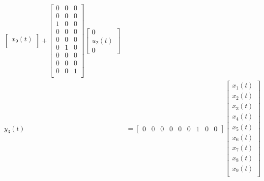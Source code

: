 \documentclass[12pt,a4paper]{article}
\begin{document}
\[\begin{aligned}
\begin{bmatrix}
                                        x_9(t) \\
                                    \end{bmatrix} + \begin{bmatrix}
                                                    0 & 0 & 0 \\
                                                    0 & 0 & 0 \\
                                                    1 & 0 & 0 \\
                                                    0 & 0 & 0 \\
                                                    0 & 0 & 0 \\
                                                    0 & 1 & 0 \\
                                                    0 & 0 & 0 \\
                                                    0 & 0 & 0 \\
                                                    0 & 0 & 1 \\
                                                \end{bmatrix} \begin{bmatrix}
                                                                0 \\
                                                                u_2(t) \\
                                                                0
                                                            \end{bmatrix} \\
        y_3(t) & = \begin{bmatrix}
                            0 & 0 & 0 & 0 & 0 & 0 & 1 & 0 & 0
                        \end{bmatrix} 
                                    \begin{bmatrix}
                                        x_1(t) \\
                                        x_2(t) \\
                                        x_3(t) \\
                                        x_4(t) \\
                                        x_5(t) \\
                                        x_6(t) \\
                                        x_7(t) \\
                                        x_8(t) \\
                                        x_9(t) \\
                                    \end{bmatrix}
    \end{aligned}
\]
\end{document}
